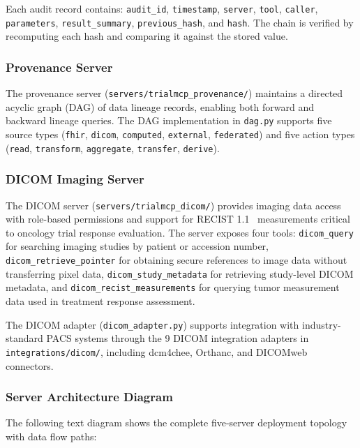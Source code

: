 \documentclass{article}
\begin{document}
Each audit record contains: \texttt{audit\_id}, \texttt{timestamp}, \texttt{server}, \texttt{tool}, \texttt{caller}, \texttt{parameters}, \texttt{result\_summary}, \texttt{previous\_hash}, and \texttt{hash}. The chain is verified by recomputing each hash and comparing it against the stored value.

\subsubsection{Provenance Server}

The provenance server (\texttt{servers/trialmcp\_provenance/}) maintains a directed acyclic graph (DAG) of data lineage records, enabling both forward and backward lineage queries. The DAG implementation in \texttt{dag.py} supports five source types (\texttt{fhir}, \texttt{dicom}, \texttt{computed}, \texttt{external}, \texttt{federated}) and five action types (\texttt{read}, \texttt{transform}, \texttt{aggregate}, \texttt{transfer}, \texttt{derive}).

\subsubsection{DICOM Imaging Server}

The DICOM server (\texttt{servers/trialmcp\_dicom/}) provides imaging data access with role-based permissions and support for RECIST 1.1~\cite{eisenhauer2009recist} measurements critical to oncology trial response evaluation. The server exposes four tools: \texttt{dicom\_query} for searching imaging studies by patient or accession number, \texttt{dicom\_retrieve\_pointer} for obtaining secure references to image data without transferring pixel data, \texttt{dicom\_study\_metadata} for retrieving study-level DICOM metadata, and \texttt{dicom\_recist\_measurements} for querying tumor measurement data used in treatment response assessment.

The DICOM adapter (\texttt{dicom\_adapter.py}) supports integration with industry-standard PACS systems through the 9 DICOM integration adapters in \texttt{integrations/dicom/}, including dcm4chee, Orthanc, and DICOMweb connectors.

\subsubsection{Server Architecture Diagram}

The following text diagram shows the complete five-server deployment topology with data flow paths:
\end{document}
